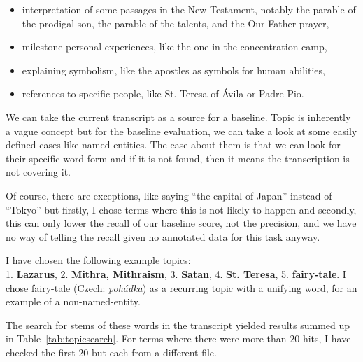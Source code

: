 \documentclass[12pt,a4paper]{report}
\begin{document}
\begin{itemize}
\item{interpretation of some passages in the New Testament, notably the parable
of the prodigal son, the parable of the talents, and the Our Father prayer,}
\item{milestone personal experiences, like the one in the concentration camp,}
\item{explaining symbolism, like the apostles as symbols for human abilities,}
\item{references to specific people, like St. Teresa of \'{A}vila or Padre Pio.}
\end{itemize}

We can take the current transcript %
as a source for a baseline.
Topic is inherently a vague concept %
but for the baseline evaluation, we can take a look at some easily defined cases
like named entities. The ease about them is that we can look for their specific
word form and if it is not found, then it means the transcription is not
covering it.

Of course, there are exceptions, like saying ``the capital of Japan'' instead of
``Tokyo'' but firstly, I chose terms where this is not likely to happen and
secondly, this can only lower the recall of our baseline score, not the
precision, and we have no way of telling the recall given no annotated data
for this task anyway.

I have chosen the following example topics:\\
1. \textbf{Lazarus},
2. \textbf{Mithra, Mithraism},
3. \textbf{Satan},
4. \textbf{St. Teresa},
5. \textbf{fairy-tale}.
I chose fairy-tale (Czech: \emph{poh\'{a}dka}) as a recurring topic with a
unifying word, for an example of a non-named-entity.

The search for stems of these words in the transcript
yielded results summed up in Table~\ref{tab:topicsearch}. For terms where there
were more than 20 hits, I have checked the first 20 but each from a different
file.
\end{document}
